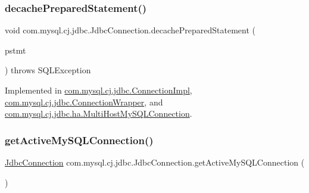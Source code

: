 \mbox{\label{interfacecom_1_1mysql_1_1cj_1_1jdbc_1_1_jdbc_connection_abf867252ec91eb8d6ed6ec4fb34b2686}} 
\subsubsection{\texorpdfstring{decache\+Prepared\+Statement()}{decachePreparedStatement()}}
{\footnotesize\ttfamily void com.\+mysql.\+cj.\+jdbc.\+Jdbc\+Connection.\+decache\+Prepared\+Statement (\begin{DoxyParamCaption}\item[{\mbox{\hyperlink{interfacecom_1_1mysql_1_1cj_1_1jdbc_1_1_jdbc_prepared_statement}{Jdbc\+Prepared\+Statement}}}]{pstmt }\end{DoxyParamCaption}) throws S\+Q\+L\+Exception}



Implemented in \mbox{\hyperlink{classcom_1_1mysql_1_1cj_1_1jdbc_1_1_connection_impl_a06f0c5a49bcacd787553162a3926b1b7}{com.\+mysql.\+cj.\+jdbc.\+Connection\+Impl}}, \mbox{\hyperlink{classcom_1_1mysql_1_1cj_1_1jdbc_1_1_connection_wrapper_a5cce5ef3352d7de7eeaa7483ba4d1a4c}{com.\+mysql.\+cj.\+jdbc.\+Connection\+Wrapper}}, and \mbox{\hyperlink{classcom_1_1mysql_1_1cj_1_1jdbc_1_1ha_1_1_multi_host_my_s_q_l_connection_aa76a527ef57c07af874082a721628649}{com.\+mysql.\+cj.\+jdbc.\+ha.\+Multi\+Host\+My\+S\+Q\+L\+Connection}}.

\mbox{\label{interfacecom_1_1mysql_1_1cj_1_1jdbc_1_1_jdbc_connection_aa5b980c79d1c7d58535c5c469e3d4f24}} 
\subsubsection{\texorpdfstring{get\+Active\+My\+S\+Q\+L\+Connection()}{getActiveMySQLConnection()}}
{\footnotesize\ttfamily \mbox{\hyperlink{interfacecom_1_1mysql_1_1cj_1_1jdbc_1_1_jdbc_connection}{Jdbc\+Connection}} com.\+mysql.\+cj.\+jdbc.\+Jdbc\+Connection.\+get\+Active\+My\+S\+Q\+L\+Connection (\begin{DoxyParamCaption}{ }\end{DoxyParamCaption})}



